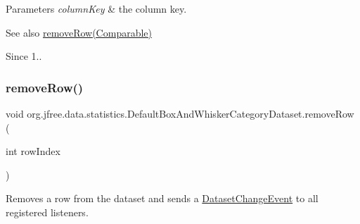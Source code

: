 \begin{DoxyParams}{Parameters}
{\em column\+Key} & the column key.\\
\hline
\end{DoxyParams}
\begin{DoxySeeAlso}{See also}
\mbox{\hyperlink{classorg_1_1jfree_1_1data_1_1statistics_1_1_default_box_and_whisker_category_dataset_a574143d92c8a301f0f1d8c13522a0295}{remove\+Row(\+Comparable)}}
\end{DoxySeeAlso}
\begin{DoxySince}{Since}
1.. 
\end{DoxySince}
\mbox{\label{classorg_1_1jfree_1_1data_1_1statistics_1_1_default_box_and_whisker_category_dataset_af24e62453a400ecb5461a61845ba83e3}} 
\subsubsection{\texorpdfstring{remove\+Row()}{removeRow()}\hspace{0.1cm}{\footnotesize\ttfamily [1/2]}}
{\footnotesize\ttfamily void org.\+jfree.\+data.\+statistics.\+Default\+Box\+And\+Whisker\+Category\+Dataset.\+remove\+Row (\begin{DoxyParamCaption}\item[{int}]{row\+Index }\end{DoxyParamCaption})}

Removes a row from the dataset and sends a \mbox{\hyperlink{}{Dataset\+Change\+Event}} to all registered listeners.


